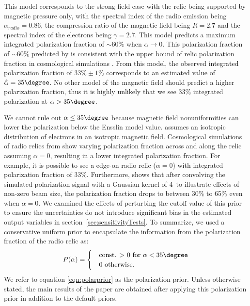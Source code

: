 This model corresponds to the strong field case with the relic being supported by
magnetic pressure only, with the spectral index of the radio
emission being $\alpha_{radio} = 0.86$, the compression ratio of the
magnetic field being
$R=2.7$ and the spectral index of the electrons being $\gamma = 2.7$. 
This model predicts a maximum integrated polarization fraction of
$\sim60\%$ when $\alpha \rightarrow 0$. 
This  polarization fraction of $\sim60\%$ predicted by \citep{E98} is
consistent with the upper bound of relic polarization fraction in cosmological
simulations \citep{S13}. From this model, the
observed integrated polarization fraction of $33\%\pm1\%$ corresponds to an estimated value
of $\hat{\alpha}  = 35\degree$. 
No other model of the magnetic field should predict 
a higher polarization fraction, thus it is highly unlikely that we see 33\%
integrated polarization at $\alpha > 35\degree$.  
\par

We cannot rule out $\alpha \leq 35\degree$ because magnetic field
nonuniformities can lower the polarization below the Ensslin model value.
\cite{E98} assumes an isotropic distribution of electrons in an isotropic magnetic field. Cosmological
simulations of radio relics from \cite{S13} show varying polarization
fraction across and along the relic assuming $\alpha = 0$, resulting in a
lower integrated polarization fraction. For example, it is possible to see 
a edge-on radio relic ($\alpha = 0$) with integrated polarization fraction of 33\%. 
Furthermore, \cite{S13} shows that after convolving the
simulated polarization signal with a Gaussian kernel of 4\arcmin~to
illustrate effects of non-zero beam size, the polarization fraction drops
to between 30\% to 65\% even when $\alpha = 0$. We examined the effects of perturbing
the cutoff value of this prior to ensure the uncertainties do not
introduce significant bias in the estimated output variables in
section~\ref{sec:sensitivityTests}.
To summarize, we used a conservative uniform prior to encapsulate the
information from the polarization fraction of the radio relic as:
\begin{equation}
P(\alpha) = 
	\begin{cases}
	& \text{const. $>$ 0 for  }\alpha < 35 \degree \\ 
	& 0 \text{ otherwise}\label{eqn:polarprior}.
	\end{cases}
\end{equation}
We refer to equation \ref{eqn:polarprior} as the polarization prior. Unless
otherwise stated, the main results of the paper are obtained after applying
this polarization prior in addition to the default priors.

